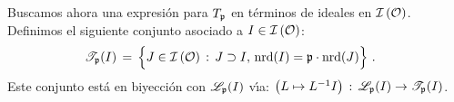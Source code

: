 Buscamos ahora una expresi\'{o}n para $T_{\frak p}$ en t\'{e}rminos de ideales
en $\ideales{\cal O}$. Definimos el siguiente conjunto asociado a
$I\in\ideales{\cal O}$:
\begin{align*}
	\mathscr T_{\frak p}(I) & \,=\,\Big\{J\in\ideales{\cal O}\,:\,
		J\supset I,\,\nrd(I)=\frak p\cdot\nrd(J)\Big\}
	\text{ .}
\end{align*}
%
%
Este conjunto est\'{a} en biyecci\'{o}n con $\mathscr L_{\frak p}(I)$ v\'{\i}a:
\begin{math}
	\big(L\mapsto L^{-1}I\big)\,:\,\mathscr L_{\frak p}(I)\rightarrow
		\mathscr T_{\frak p}(I)
\end{math}.
%
% 
